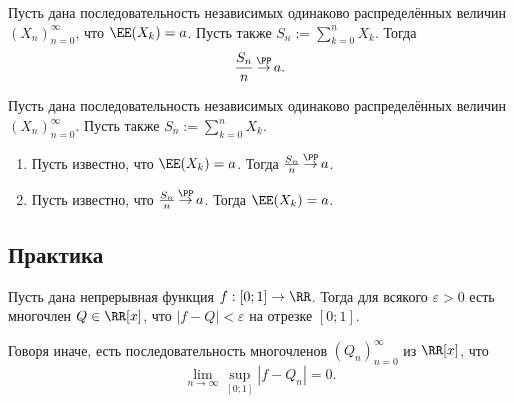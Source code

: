 \documentclass[12pt,a4paper]{article}
\newcommand{\probto}{\mathop{\stackrel{\PP}{\to}}}
\begin{document}
    \begin{theorem}[Хинчина]
        Пусть дана последовательность независимых одинаково распределённых величин $(X_n)_{n=0}^\infty$, что $\EE(X_k) = a$. Пусть также $S_n := \sum_{k=0}^n X_k$. Тогда
        \[\frac{S_n}{n} \probto a.\]
    \end{theorem}

    \begin{theorem}[Колмогорова]
        Пусть дана последовательность независимых одинаково распределённых величин $(X_n)_{n=0}^\infty$. Пусть также $S_n := \sum_{k=0}^n X_k$.
        \begin{enumerate}
            \item Пусть известно, что $\EE(X_k) = a$. Тогда $\frac{S_n}{n} \probto a$.
            \item Пусть известно, что $\frac{S_n}{n} \probto a$. Тогда $\EE(X_k) = a$.
        \end{enumerate}
    \end{theorem}

    \subsection{Практика}

    \begin{theorem}
        Пусть дана непрерывная функция $f: [0; 1] \to \RR$. Тогда для всякого $\varepsilon > 0$ есть многочлен $Q \in \RR[x]$, что $|f - Q| < \varepsilon$ на отрезке $[0; 1]$.

        Говоря иначе, есть последовательность многочленов $(Q_n)_{n=0}^\infty$ из $\RR[x]$, что
        \[\lim_{n \to \infty} \sup_{[0; 1]} |f - Q_n| = 0.\]
    \end{theorem}
\end{document}
